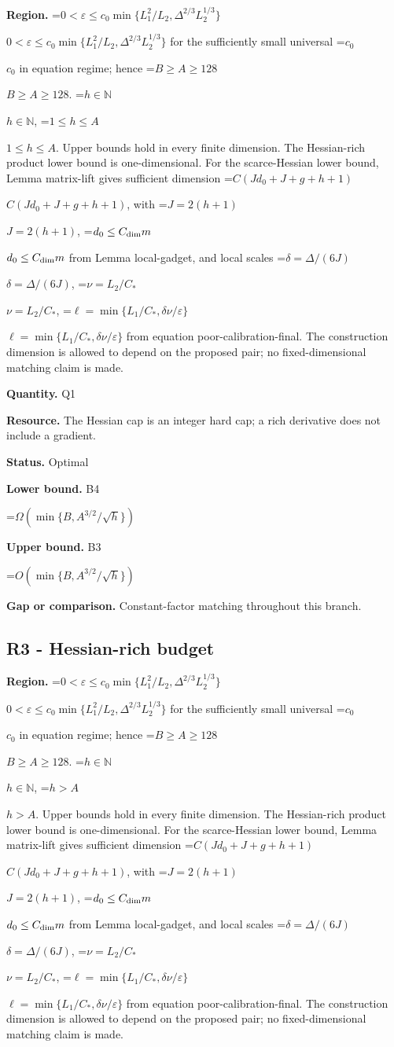 \documentclass[10pt,a4paper]{article}
\newcommand{\AtlasMath}[1]{\par\begingroup\centering\setbox0=\hbox{$\displaystyle #1$}\ifdim\wd0>1.4\linewidth\typeout{ATLAS WIDE FORMULA: \the\wd0}\fi\ifdim\wd0>\linewidth\resizebox{\linewidth}{!}{\box0}\else\box0\fi\par\endgroup}
\newcommand{\AtlasInlineMath}[1]{\begingroup\setbox0=\hbox{$#1$}\ifdim\wd0>.4\linewidth\endgroup\AtlasMath{#1}\else\endgroup$#1$\fi}
\begin{document}
\textbf{Region.} \AtlasInlineMath{0<\varepsilon\le c_0\min\{L_1^2/L_2,\Delta^{2/3}L_2^{1/3}\}} for the sufficiently small universal \AtlasInlineMath{c_0} in equation regime; hence \AtlasInlineMath{B\ge A\ge128}. \AtlasInlineMath{h\in\mathbb N}, \AtlasInlineMath{1\le h\le A}. Upper bounds hold in every finite dimension. The Hessian-rich product lower bound is one-dimensional. For the scarce-Hessian lower bound, Lemma matrix-lift gives sufficient dimension \AtlasInlineMath{C(Jd_0+J+g+h+1)}, with \AtlasInlineMath{J=2(h+1)}, \AtlasInlineMath{d_0\le C_{\rm dim}m} from Lemma local-gadget, and local scales \AtlasInlineMath{\delta=\Delta/(6J)}, \AtlasInlineMath{\nu=L_2/C_*}, \AtlasInlineMath{\ell=\min\{L_1/C_*,\delta\nu/\varepsilon\}} from equation poor-calibration-final. The construction dimension is allowed to depend on the proposed pair; no fixed-dimensional matching claim is made.



\textbf{Quantity.} Q1



\textbf{Resource.} The Hessian cap is an integer hard cap; a rich derivative does not include a gradient.



\textbf{Status.} Optimal



\textbf{Lower bound.} B4



\AtlasMath{\Omega\!\left(\min\{B,A^{3/2}/\sqrt h\}\right)}


\textbf{Upper bound.} B3



\AtlasMath{O\!\left(\min\{B,A^{3/2}/\sqrt h\}\right)}


\textbf{Gap or comparison.} Constant-factor matching throughout this branch.



\subsection{R3 - Hessian-rich budget}


\textbf{Region.} \AtlasInlineMath{0<\varepsilon\le c_0\min\{L_1^2/L_2,\Delta^{2/3}L_2^{1/3}\}} for the sufficiently small universal \AtlasInlineMath{c_0} in equation regime; hence \AtlasInlineMath{B\ge A\ge128}. \AtlasInlineMath{h\in\mathbb N}, \AtlasInlineMath{h>A}. Upper bounds hold in every finite dimension. The Hessian-rich product lower bound is one-dimensional. For the scarce-Hessian lower bound, Lemma matrix-lift gives sufficient dimension \AtlasInlineMath{C(Jd_0+J+g+h+1)}, with \AtlasInlineMath{J=2(h+1)}, \AtlasInlineMath{d_0\le C_{\rm dim}m} from Lemma local-gadget, and local scales \AtlasInlineMath{\delta=\Delta/(6J)}, \AtlasInlineMath{\nu=L_2/C_*}, \AtlasInlineMath{\ell=\min\{L_1/C_*,\delta\nu/\varepsilon\}} from equation poor-calibration-final. The construction dimension is allowed to depend on the proposed pair; no fixed-dimensional matching claim is made.
\end{document}
